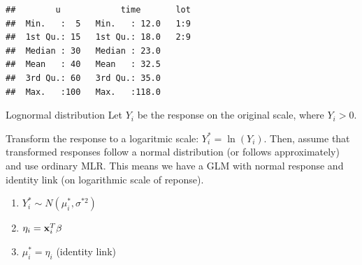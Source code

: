 \documentclass[
  ignorenonframetext,
]{beamer}
\newenvironment{Shaded}{\begin{snugshade}}{\end{snugshade}}
\newcommand{\AttributeTok}[1]{\textcolor[rgb]{0.13,0.29,0.53}{#1}}
\newcommand{\FunctionTok}[1]{\textcolor[rgb]{0.13,0.29,0.53}{\textbf{#1}}}
\newcommand{\NormalTok}[1]{#1}
\newcommand{\OtherTok}[1]{\textcolor[rgb]{0.56,0.35,0.01}{#1}}
\newcommand{\SpecialCharTok}[1]{\textcolor[rgb]{0.81,0.36,0.00}{\textbf{#1}}}
\newcommand{\StringTok}[1]{\textcolor[rgb]{0.31,0.60,0.02}{#1}}
\providecommand{\tightlist}{%
  \setlength{\itemsep}{0pt}\setlength{\parskip}{0pt}}
\begin{document}
\begin{frame}[fragile]
\begin{Shaded}
\end{Shaded}

\begin{verbatim}
##        u            time       lot  
##  Min.   :  5   Min.   : 12.0   1:9  
##  1st Qu.: 15   1st Qu.: 18.0   2:9  
##  Median : 30   Median : 23.0        
##  Mean   : 40   Mean   : 32.5        
##  3rd Qu.: 60   3rd Qu.: 35.0        
##  Max.   :100   Max.   :118.0
\end{verbatim}
\end{frame}

\begin{frame}{Lognormal distribution}
\protect\hypertarget{lognormal-distribution}{}
Let \(Y_i\) be the response on the original scale, where \(Y_i>0\).

Transform the response to a logaritmic scale: \(Y^*_i=\ln(Y_i)\). Then,
assume that transformed responses follow a normal distribution (or
follows approximately) and use ordinary MLR. This means we have a GLM
with normal response and identity link (on logarithmic scale of
reponse).

\begin{enumerate}
\tightlist
\item
  \(Y^*_i \sim N(\mu^{*}_i,\sigma^{*2})\)
\item
  \(\eta_i={\bf x}_i^T\beta\)
\item
  \(\mu^{*}_i=\eta_i\) (identity link)
\end{enumerate}
\end{frame}
\end{document}
